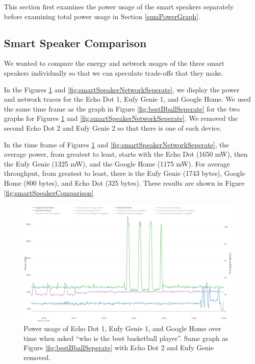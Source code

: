 This section first examines the power usage of the smart speakers separately before examining total power usage in Section \ref{sumPowerGraph}.

\subsection{Smart Speaker Comparison}
\label{smartSpeakerComparisonSection}
We wanted to compare the energy and network usages of the three smart speakers individually so that we can speculate trade-offs that they make.

In the Figures \ref{fig:smartSpeakerSeperate} and \ref{fig:smartSpeakerNetworkSeperate}, we display the power and network traces for the Echo Dot 1, Eufy Genie 1, and Google Home. We used the same time frame as the graph in Figure \ref{fig:bestBballSeperate} for the two graphs for Figures \ref{fig:smartSpeakerSeperate} and \ref{fig:smartSpeakerNetworkSeperate}. We removed the second Echo Dot 2 and Eufy Genie 2 so that there is one of each device.

In the time frame of Figures \ref{fig:smartSpeakerSeperate} and \ref{fig:smartSpeakerNetworkSeperate}, the average power, from greatest to least, starts with the Echo Dot (1650 mW), then the Eufy Genie (1325 mW), and the Google Home (1175 mW). For average throughput, from greatest to least, there is the Eufy Genie (1743 bytes), Google Home (800 bytes), and Echo Dot (325 bytes). These results are shown in Figure \ref{fig:smartSpeakerComparison}

\begin{figure}[H]
  \centering
  \includegraphics[width=1\textwidth]{figures/smartSpeakerSeperate.png}
  \caption{Power usage of Echo Dot 1, Eufy Genie 1, and Google Home over time when asked ``who is the best basketball player''. Same graph as Figure \ref{fig:bestBballSeperate} with Echo Dot 2 and Eufy Genie removed.}
  \label{fig:smartSpeakerSeperate}
\end{figure}


